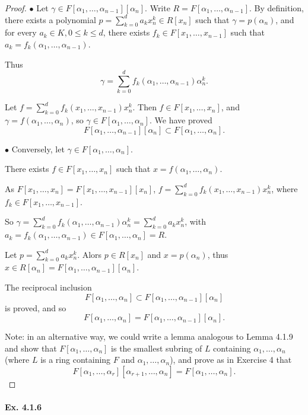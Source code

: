 \documentclass[11pt,a4paper]{article}
\begin{document}
\begin{proof}
$\bullet$ Let $\gamma \in F[\alpha_1,\ldots,\alpha_{n-1}][\alpha_n]$. Write  $R =  F[\alpha_1,\ldots,\alpha_{n-1}]$. By definition, there exists a polynomial $p = \sum_{k=0}^d a_k x_n^k \in R[x_n]$ such that $\gamma= p(\alpha_n)$, and for every  $a_k \in K, 0 \leq k \leq d$, there exists $f_k  \in F[x_1,\ldots,x_{n-1}]$ such that $a_k = f_k(\alpha_1,\ldots,\alpha_{n-1})$.

Thus $$\gamma = \sum\limits_{k=0}^d  f_k(\alpha_1,\ldots,\alpha_{n-1})\alpha_n^k.$$

Let $f = \sum\limits_{k=0}^d f_k(x_1,\ldots,x_{n-1}) x_n^k$. Then $f \in F[x_1,\ldots,x_n]$, and $\gamma = f(\alpha_1,\ldots,\alpha_n)$, so $\gamma \in F[\alpha_1,\ldots,\alpha_n]$. We have proved
$$F[\alpha_1,\ldots,\alpha_{n-1}][\alpha_n] \subset F[\alpha_1,\ldots,\alpha_n].$$


$\bullet$ Conversely, let $\gamma \in F[\alpha_1,\ldots,\alpha_n]$. 

There exists $f \in F[x_1,\ldots,x_n]$ such that $x = f(\alpha_1,\ldots,\alpha_n)$.

As $F[x_1,\ldots,x_n] = F[x_1,\ldots,x_{n-1}][x_n]$, $f = \sum\limits_{k=0}^d f_k(x_1,\ldots,x_{n-1})x_n^k$, where $f_k \in F[x_1,\ldots,x_{n-1}]$.

So  $\gamma = \sum\limits_{k=0}^d f_k(\alpha_1,\ldots,\alpha_{n-1})\alpha_n^k = \sum\limits_{k=0}^d a_k x_n^k$, with $a_k = f_k(\alpha_1,\ldots,\alpha_{n-1}) \in F[\alpha_1,\ldots,\alpha_n]=R$.

Let $p = \sum_{k=0}^d a_k x_n^k$. Alors $p \in R[x_n]$ and $x = p(\alpha_n)$, thus $x \in R[\alpha_n] = F[\alpha_1,\ldots,\alpha_{n-1}][\alpha_n]$.

The reciprocal inclusion
$$F[\alpha_1,\ldots,\alpha_n] \subset F[\alpha_1,\ldots,\alpha_{n-1}][\alpha_n]$$
is proved, and so 
$$F[\alpha_1,\ldots,\alpha_n] =F[\alpha_1,\ldots,\alpha_{n-1}][\alpha_n].$$

Note: in an alternative way, we could write a lemma analogous to Lemma 4.1.9 and show that $F[\alpha_1,\ldots,\alpha_n]$ is the smallest subring of $L$ containing $ \alpha_1,\ldots,\alpha_n$ (where $L$ is a ring containing $F$ and $\alpha_1,\ldots,\alpha_n$), and prove as in Exercise 4 that
$$F[\alpha_1,\ldots,\alpha_r][\alpha_{r+1},\ldots,\alpha_n] = F[\alpha_1,\ldots,\alpha_n].$$
\end{proof}

\paragraph{Ex. 4.1.6}
\end{document}

